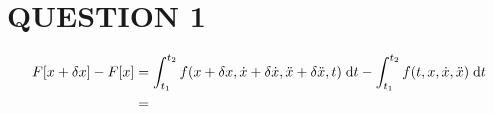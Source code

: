 \documentclass[a4paper]{article}
\begin{document}
	
\maketitle

\section{QUESTION 1}

\begin{align*}
F[x + \delta x] - F[x] & = \int_{t_{1}}^{t_{2}} f(x + \delta x, \dot{x} + \delta \dot{x}, \ddot{x} + \delta \ddot x, t ) \; \mathrm{d} t - \int_{t_{1}}^{t_2} f(t,x,\dot{x},\ddot{x}) \; \mathrm{d} t   \\
& = 
\end{align*}
\end{document}
